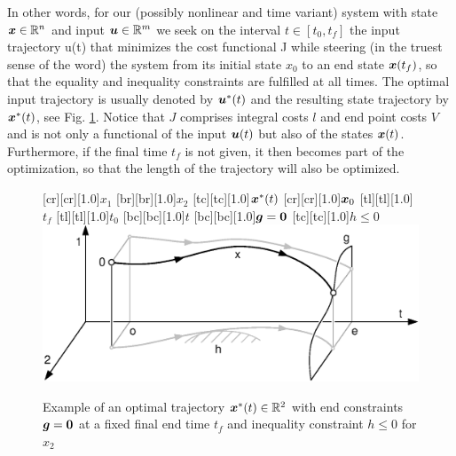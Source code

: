 In other words, for our (possibly nonlinear and time variant) system with state $\boldsymbol{x} \in \mathbb R^n$ and input $\boldsymbol{u} \in \mathbb R^m$ we seek on the interval $t\in[t_0, t_f]$ the input trajectory u(t) that minimizes the cost functional J while steering (in the truest sense of the word) the system from its initial state $x_0$ to an end state $\boldsymbol{x}(t_f)$, so that the equality and inequality constraints are fulfilled at all times. The optimal input trajectory is usually denoted by $\boldsymbol{u}^\ast(t)$ and the resulting state trajectory by $\boldsymbol{x}^\ast(t)$, 
see Fig. \ref{fig:dynamische_Optimierung_endvorgabe}. Notice that $J$ comprises integral costs $l$ and end point costs $V$ and is not only a functional of the input $\boldsymbol{u}(t)$ but also of the states $\boldsymbol{x}(t)$. Furthermore, if the final time $t_f$ is not given, it then becomes part of the optimization, so that the length of the trajectory will also be optimized.
\begin{figure}[ht]
[cr][cr][1.0]{$x_1$}
[br][br][1.0]{$x_2$}
[tc][tc][1.0]{$\boldsymbol{x}^\ast(t)$}
[cr][cr][1.0]{$\boldsymbol{x}_0$}
[tl][tl][1.0]{$t_f$}
[tl][tl][1.0]{$t_0$}
[bc][bc][1.0]{$t$}
[bc][bc][1.0]{$\boldsymbol{g}=\boldsymbol{0}$}
[tc][tc][1.0]{$h\leq0$}
	\centering
  	\includegraphics[width=1.\textwidth,clip, trim = 0cm 0cm 0cm 0cm]{pics/2_Darstellung_dynamische_Optimierung_endvorgabe.eps}
  	\caption[Example of an optimal trajectory]{Example of an optimal trajectory $\boldsymbol{x}^\ast (t)\in \mathbb{R}^2$ with end constraints $\boldsymbol{g}=\boldsymbol{0}$ at a fixed final end time $t_f$ and inequality constraint $h\leq 0$ for $x_2$}
    \label{fig:dynamische_Optimierung_endvorgabe}
\end{figure}

